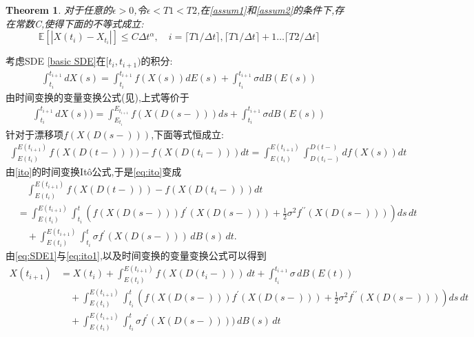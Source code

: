 \documentclass[12pt,final]{article}
\makeatletter
\numberwithin{equation}{section}
\numberwithin{figure}{section}
\numberwithin{table}{section}
\theoremstyle{plain}
\renewcommand{\proofname}{proof}
\newtheorem{Theorem}{Theorem}[section]   %
\theoremstyle{Definition}
\theoremstyle{Remark}
\renewenvironment{proof}[1][\proofname]{\par
	\pushQED{\qed}%
	\normalfont \topsep6\p@\@plus6\p@\relax
	\trivlist\item[\hskip\labelsep
	\bfseries #1\@addpunct{\,:\,}]\ignorespaces
}{%
	\popQED\endtrivlist\@endpefalse
}
\makeatother
\begin{document}
	\begin{Theorem}\label{main th}
		对于任意的$\epsilon>0$,令$\epsilon < T1 < T2$,在\textnormal{\cref{assum1}}和\textnormal{\cref{assum2}}的条件下,存在常数C,使得下面的不等式成立:
		$$\mathbb{E}[|X({t_i})-X_{t_i}|]\le C\Delta t^\alpha,\quad i=\lceil T1/\Delta t \rceil,\lceil T1/\Delta t \rceil+1 \ldots \lceil T2/\Delta t \rceil$$
	\end{Theorem}
	\begin{proof}
		
		考虑SDE \eqref{basic SDE}在$[t_i,t_{i+1})$的积分:
		\begin{align}
			\int_{t_i}^{t_{i+1}}dX(s)=\int_{t_i}^{t_{i+1}}f(X(s))dE(s)+\int_{t_i}^{t_{i+1}}\sigma dB(E(s))
		\end{align}
		由时间变换的变量变换公式(见\cite{kobayashi2011stochastic}),上式等价于
		\begin{align}\label{eq:SDE1}
			\int_{t_i}^{t_{i+1}}dX(s))=\int_{E_{t_i}}^{E_{t_{i+1}}}f(X(D(s-)))ds+\int_{t_i}^{t_{i+1}}\sigma dB(E(s))
		\end{align}
		针对于漂移项$f(X(D(s-)))$,下面等式恒成立:
		\begin{align}\label{eq:ito}
			\int_{E(t_i)}^{E(t_{i+1})} f(X(D(t-)))) - f(X(D(t_i-))) dt = \int_{E(t_i)}^{E(t_{i+1})} \int^{D(t-)}_{D(t_i-)} df(X(s)) dt
		\end{align}
		由\cref{ito}的时间变换It\^{o}公式,于是\eqref{eq:ito}变成
		\begin{equation}\label{eq:ito1}
			\begin{aligned}
				&\quad\int_{E(t_i)}^{E(t_{i+1})} f(X(D(t-))) - f(X(D(t_i-))) dt \\
				&= \int_{E(t_i)}^{E(t_{i+1})} \int_{t_i}^{t} \left( f(X(D(s-))) f^{\prime}(X(D(s-))) + \frac{1}{2} \sigma^2 f^{\prime\prime}(X(D(s-))) \right) ds \, dt\\
				&\quad + \int_{E(t_i)}^{E(t_{i+1})} \int_{t_i}^{t} \sigma f^{\prime}(X(D(s-))) \, dB(s) \, dt .
			\end{aligned}
		\end{equation}
		由\eqref{eq:SDE1}与\eqref{eq:ito1},以及时间变换的变量变换公式可以得到
		\begin{align*}
			X(t_{i+1}) 
			&= X(t_i) + \int_{E(t_i)}^{E(t_{i+1})} f(X({D(t_i-)})) \, dt + \int_{t_i}^{t_{i+1}} \sigma \, dB(E(t)) \\
			&\quad + \int_{E(t_i)}^{E(t_{i+1})} \int_{t_i}^{t}\left( f(X(D(s-))) f^{\prime}(X(D(s-))) + \frac{1}{2} \sigma^2 f^{\prime\prime}(X(D(s-))) \right) ds \, dt \\
			&\quad + \int_{E(t_i)}^{E(t_{i+1})} \int_{t_i}^{t}\sigma f^{\prime}(X(D(s-)))) \, dB(s) \, dt \\

\end{align*}
\end{proof}
\end{document}
